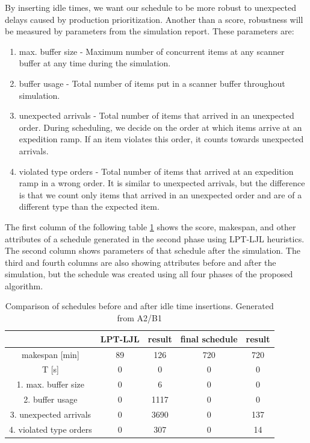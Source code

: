 \documentclass{ctuthesis}
\begin{document}
By inserting idle times, we want our schedule to be more robust to unexpected delays caused by production prioritization. Another than a score, robustness will be measured by parameters from the simulation report. These parameters are:

\begin{enumerate}
    \item max. buffer size - Maximum number of concurrent items at any scanner buffer at any time during the simulation.
    \item buffer usage - Total number of items put in a scanner buffer throughout simulation.
    \item unexpected arrivals - Total number of items that arrived in an unexpected order. During scheduling, we decide on the order at which items arrive at an expedition ramp. If an item violates this order, it counts towards unexpected arrivals.
    \item violated type orders - Total number of items that arrived at an expedition ramp in a wrong order. It is similar to unexpected arrivals, but the difference is that we count only items that arrived in an unexpected order and are of a different type than the expected item. 
\end{enumerate}

The first column of the following table  \ref{tab:idle1} shows the score, makespan, and other attributes of a schedule generated in the second phase using LPT-LJL heuristics. The second column shows parameters of that schedule after the simulation. The third and fourth columns are also showing attributes before and after the simulation, but the schedule was created using all four phases of the proposed algorithm.

\begin{table}[H]
\begin{tabular}{ |c|| c | c | c | c |} 
\hline
 & LPT-LJL & result & final schedule & result \\ 
\hline
makespan [min] & 89 & 126 & 720 & 720 \\
\hline
T [s]& 0 & 0 & 0 & 0 \\
\hline
1. max. buffer size & 0 & 6 & 0 & 0\\ 
\hline
2. buffer usage  & 0 & 1117 & 0 & 0\\ 
\hline
3. unexpected arrivals & 0 & 3690 & 0 & 137\\ 
\hline
4. violated type orders & 0 & 307 & 0 & 14\\ 
\hline
\end{tabular}
\caption{Comparison of schedules before and after idle time insertions. Generated from A2/B1} \label{tab:idle1}
\end{table}
\end{document}
